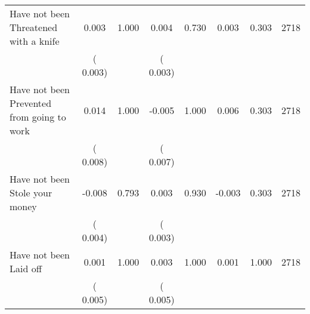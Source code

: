 \begin{tabular}{l*{7}{c}}
 Have not been Threatened with a knife       &              0.003       &        1.000  &              0.004       &        0.730  &              0.003       &              0.303 &  2718 \\ 
                       &       (       0.003)             &                               &       (       0.003)                     &                               &                                               &                                &                      \\ 

 Have not been Prevented from going to work       &              0.014       &        1.000  &             -0.005       &        1.000  &              0.006       &              0.303 &  2718 \\ 
                       &       (       0.008)             &                               &       (       0.007)                     &                               &                                               &                                &                      \\ 

 Have not been Stole your money       &             -0.008       &        0.793  &              0.003       &        0.930  &             -0.003       &              0.303 &  2718 \\ 
                       &       (       0.004)             &                               &       (       0.003)                     &                               &                                               &                                &                      \\ 

 Have not been Laid off       &              0.001       &        1.000  &              0.003       &        1.000  &              0.001       &              1.000 &  2718 \\ 
                       &       (       0.005)             &                               &       (       0.005)                     &                               &                                               &                                &                      \\ 

\hline \end{tabular}